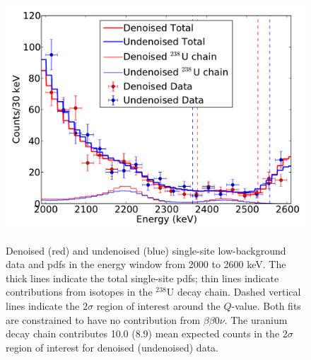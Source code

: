 \begin{figure}
\begin{center}
\includegraphics[keepaspectratio=true,width=\textwidth]{DenoisedVsUndenoised_TotalPdfsWithData_rnrange_withlines.pdf}
\end{center}
\renewcommand{\baselinestretch}{1}
\small\normalsize
\begin{quote}
\caption{Denoised (red) and undenoised (blue) single-site low-background data and pdfs in the energy window from 2000 to 2600 keV.  The thick lines indicate the total single-site pdfs; thin lines indicate contributions from isotopes in the $^{238}$U decay chain.  Dashed vertical lines indicate the $2\sigma$ region of interest around the $Q$-value.  Both fits are constrained to have no contribution from $\beta\beta 0\nu$.  The uranium decay chain contributes 10.0 (8.9) mean expected counts in the $2\sigma$ region of interest for denoised (undenoised) data.}
\label{fig:DenoisedComparison_rnSS}
\end{quote}
\end{figure}
\renewcommand{\baselinestretch}{2}
\small\normalsize

